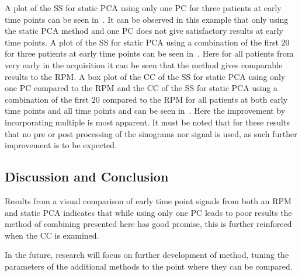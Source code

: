             A plot of the \gls{SS} for static \gls{PCA} using only one \gls{PC} for three patients at early time points can be seen in~. It can be observed in this example that only using the static \gls{PCA} method and one \gls{PC} does not give satisfactory results at early time points. A plot of the \gls{SS} for static \gls{PCA} using a combination of the first $20$  for three patients at early time points can be seen in~. Here for all patients from very early in the acquisition it can be seen that the method gives comparable results to the \gls{RPM}. A box plot of the \gls{CC} of the \gls{SS} for static \gls{PCA} using only one \gls{PC} compared to the \gls{RPM} and the \gls{CC} of the \gls{SS} for static \gls{PCA} using a combination of the first $20$  compared to the \gls{RPM} for all patients at both early time points and all time points and  can be seen in~. Here the improvement by incorporating multiple  is most apparent. It must be noted that for these results that no pre or post processing of the sinograms nor signal is used, as such further improvement is to be expected.
            
        \subsection{Discussion and Conclusion} \label{sec:pca_data_driven_surrogate_signal_extraction_methods_for_dynamic_pet_discussion_and_conclusion}
            Results from a visual comparison of early time point signals from both an \gls{RPM} and static \gls{PCA} indicates that while using only one \gls{PC} leads to poor results the method of combining  presented here has good promise, this is further reinforced when the \gls{CC} is examined.
            
            In the future, research will focus on further development of method, tuning the parameters of the additional methods to the point where they can be compared.
    
        
